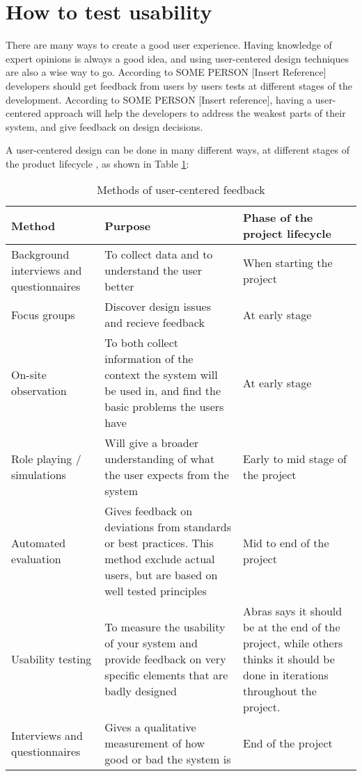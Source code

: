 \section{How to test usability}
There are many ways to create a good user experience. Having knowledge of expert opinions is always a good idea, and using user-centered design techniques are also a wise way to go. According to SOME PERSON [Insert Reference] developers should get feedback from users by users tests at different stages of the development. According to SOME PERSON [Insert reference], having a user-centered approach will help the developers to address the weakest parts of their system, and give feedback on design decisions. 

A user-centered design can be done in many different ways, at different stages of the product lifecycle \cite{abrasusercentereddesign}, as shown in Table \ref{table:designduringlifecycle}:

\begin{table}[H]
\begin{tabular}{|p{5cm} | p{5cm} | p{5cm} |}
\hline
\textbf{Method} & \textbf{Purpose} & \textbf{Phase of the project lifecycle} \\ \hline
Background interviews and questionnaires & To collect data and to understand the user better & When starting the project \\ \hline
Focus groups & Discover design issues and recieve feedback & At early stage \\ \hline
On-site observation & To both collect information of the context the system will be used in, and find the basic problems the users have & At early stage \\ \hline
Role playing / simulations & Will give a broader understanding of what the user expects from the system & Early to mid stage of the project \\ \hline
Automated evaluation & Gives feedback on deviations from standards or best practices. This method exclude actual users, but are based on well tested principles & Mid to end of the project \\ \hline
Usability testing & To measure the usability of your system and provide feedback on very specific elements that are badly designed & Abras \cite{abrasusercentereddesign} says it should be at the end of the project, while others \cite{schneidermanusercentered} thinks it should be done in iterations throughout the project. \\ \hline
Interviews and questionnaires & Gives a qualitative measurement of how good or bad the system is & End of the project \\ \hline
\end{tabular}
\caption{Methods of user-centered feedback}
\label{table:designduringlifecycle}
\end{table}

